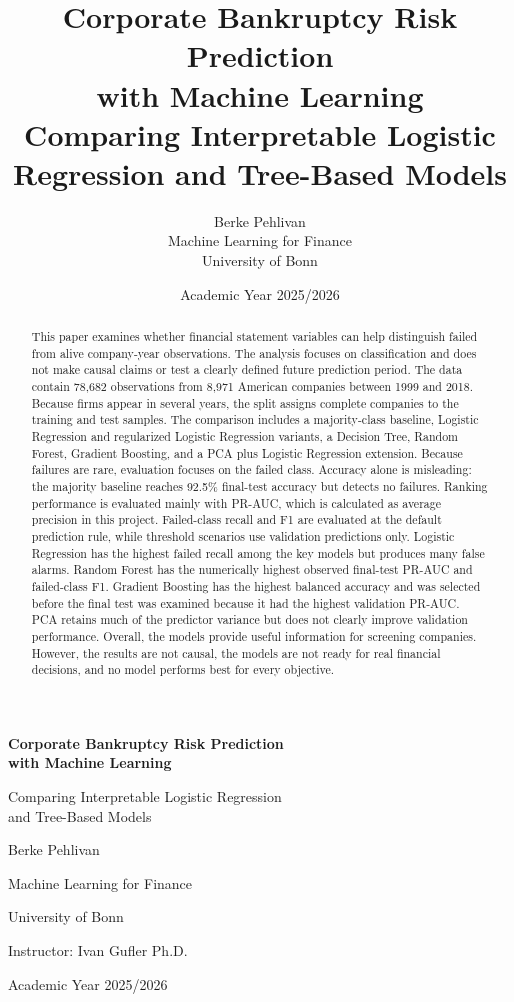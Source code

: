 \documentclass[11pt,a4paper]{article}
\title{\textbf{Corporate Bankruptcy Risk Prediction\\with Machine Learning}\\[0.6em]
\large Comparing Interpretable Logistic Regression and Tree-Based Models}
\author{Berke Pehlivan\\
\small Machine Learning for Finance\\
\small University of Bonn}
\date{Academic Year 2025/2026}
\begin{document}

\begin{titlepage}
  \centering
  \vspace*{2.5cm}
  {\LARGE\bfseries Corporate Bankruptcy Risk Prediction\\[0.25em]
  with Machine Learning\par}
  \vspace{0.8cm}
  {\large Comparing Interpretable Logistic Regression\\
  and Tree-Based Models\par}
  \vfill
  {\large Berke Pehlivan\par}
  \vspace{0.3cm}
  {\normalsize Machine Learning for Finance\par}
  {\normalsize University of Bonn\par}
  {\normalsize Instructor: Ivan Gufler Ph.D.\par}
  {\normalsize Academic Year 2025/2026\par}
  \vfill
\end{titlepage}


\begin{abstract}
This paper examines whether financial statement variables can help distinguish
failed from alive company-year observations. The analysis focuses on
classification and does not make causal claims or test a clearly defined future
prediction period. The data contain
78,682 observations from 8,971 American companies between 1999 and 2018. Because
firms appear in several years, the split assigns complete companies to the
training and test samples.
The comparison includes a majority-class baseline, Logistic Regression and
regularized Logistic Regression variants, a Decision Tree, Random Forest,
Gradient Boosting, and a PCA plus Logistic Regression extension. Because
failures are rare, evaluation focuses on the failed class. Accuracy alone is
misleading: the majority baseline reaches 92.5\% final-test accuracy but detects
no failures. Ranking performance is evaluated mainly with PR-AUC, which is
calculated as average precision in this project. Failed-class recall and F1 are evaluated at the default
prediction rule, while threshold scenarios use validation predictions only.
Logistic Regression has the highest failed recall among the key models but
produces many false alarms. Random Forest has the numerically highest observed
final-test PR-AUC and failed-class F1. Gradient Boosting has the highest
balanced accuracy and was selected before the final test was examined because it
had the highest validation PR-AUC. PCA retains
much of the predictor variance but does not clearly improve validation
performance. Overall, the models provide useful information for screening
companies. However, the results are not causal, the models are not ready for
real financial decisions, and no model performs best for every objective.
\end{abstract}
\end{document}
